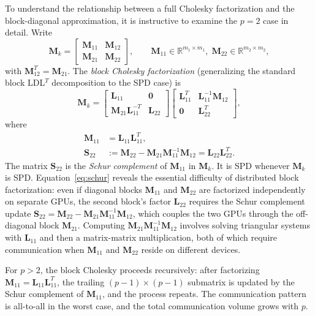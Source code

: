\documentclass[11pt,twoside]{article}
\newcommand{\R}{\mathbb{R}}
\newcommand{\bL}{\mathbf{L}}
\newcommand{\bM}{\mathbf{M}}
\newcommand{\bS}{\mathbf{S}}
\begin{document}
To understand the relationship between a full Cholesky factorization and
the block-diagonal approximation, it is instructive to examine the $p=2$
case in detail.  Write
\begin{equation}
  \bM_k =
  \begin{bmatrix}
    \bM_{11} & \bM_{12} \\
    \bM_{21} & \bM_{22}
  \end{bmatrix},
  \qquad
  \bM_{11} \in \R^{m_1 \times m_1},\;
  \bM_{22} \in \R^{m_2 \times m_2},
  \label{eq:2x2-block}
\end{equation}
with $\bM_{12}^T = \bM_{21}$.  The \emph{block Cholesky factorization}
(generalizing the standard block LDL$^T$ decomposition to the SPD case) is
\begin{equation}
  \bM_k =
  \begin{bmatrix}
    \bL_{11} & \mathbf{0} \\
    \bM_{21}\bL_{11}^{-T} & \bL_{22}
  \end{bmatrix}
  \begin{bmatrix}
    \bL_{11}^T & \bL_{11}^{-1}\bM_{12} \\
    \mathbf{0} & \bL_{22}^T
  \end{bmatrix},
  \label{eq:block-cholesky}
\end{equation}
where
\begin{align}
  \bM_{11} &= \bL_{11}\bL_{11}^T,
    \label{eq:chol-M11} \\[4pt]
  \bS_{22} &:= \bM_{22} - \bM_{21}\bM_{11}^{-1}\bM_{12}
    = \bL_{22}\bL_{22}^T.
    \label{eq:schur}
\end{align}
The matrix $\bS_{22}$ is the \emph{Schur complement} of $\bM_{11}$ in
$\bM_k$.  It is SPD whenever $\bM_k$ is SPD.  Equation~\eqref{eq:schur}
reveals the essential difficulty of distributed block factorization: even
if diagonal blocks $\bM_{11}$ and $\bM_{22}$ are factorized independently on
separate GPUs, the second block's factor $\bL_{22}$ requires the Schur
complement update $\bS_{22} = \bM_{22} - \bM_{21}\bM_{11}^{-1}\bM_{12}$,
which couples the two GPUs through the off-diagonal block $\bM_{21}$.
Computing $\bM_{21}\bM_{11}^{-1}\bM_{12}$ involves solving triangular
systems with $\bL_{11}$ and then a matrix-matrix multiplication, both of
which require communication when $\bM_{11}$ and $\bM_{22}$ reside on
different devices.

For $p > 2$, the block Cholesky proceeds recursively: after factorizing
$\bM_{11} = \bL_{11}\bL_{11}^T$, the trailing $(p-1) \times (p-1)$
submatrix is updated by the Schur complement of $\bM_{11}$, and the
process repeats.  The communication pattern is all-to-all in the worst
case, and the total communication volume grows with $p$.
\end{document}
